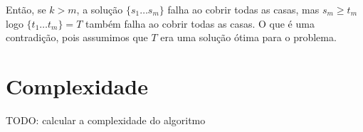 \documentclass[11pt]{article}
\begin{document}
Então, se $k>m$, a solução $\{ s_1 \ldots s_m \}$ falha ao cobrir todas as casas, mas $s_m \geq t_m$ logo $\{ t_1 \ldots t_m \} = T$
também falha ao cobrir todas as casas. O que é uma contradição, pois assumimos que $T$ era uma solução ótima para o problema.




\section{Complexidade}
\label{sec-5}

TODO: calcular a complexidade do algoritmo
\end{document}

